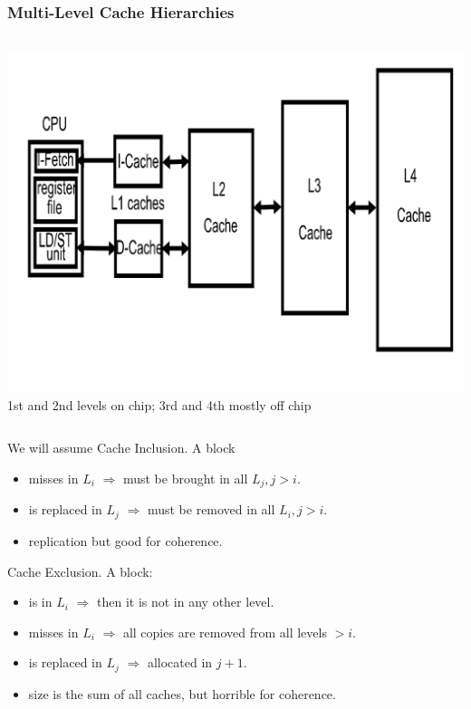 \documentclass{beamer}
\renewcommand{\emph}[1]{\textcolor{structure}{#1}}
\newcommand{\emp}[1]{\textcolor{DikuRed}{ #1}}
\begin{document}
\begin{frame}[fragile,t]
\frametitle{Multi-Level Cache Hierarchies}

\begin{columns}
\includegraphics[width=35ex]{FigsMemH/MultiLevCache}
1st and 2nd levels on chip; 3rd and 4th mostly off chip\smallskip
\end{columns}

We will assume \emph{Cache Inclusion}. A block
\begin{scriptsize}
\begin{itemize}
    \item misses in $L_i$ $\Rightarrow$ must be brought in all $L_j, j>i$.
    \item is replaced in $L_j$ $\Rightarrow$ must be removed in all $L_i, j>i$.
    \item \emp{replication} but \emph{good for coherence}.
\end  {itemize}
\end  {scriptsize}\bigskip

\emp{Cache Exclusion.} A block:
\begin{scriptsize}
\begin{itemize}
    \item is in $L_i$ $\Rightarrow$ then it is not in any other level.
    \item misses in $L_i$ $\Rightarrow$ all copies are removed from all levels $> i$.
    \item is replaced in $L_j$ $\Rightarrow$ allocated in $j+1$.
    \item \emph{size is the sum of all caches}, but \emp{horrible for coherence}.
\end  {itemize}
\end  {scriptsize}\bigskip

\end{frame}
\end{document}
